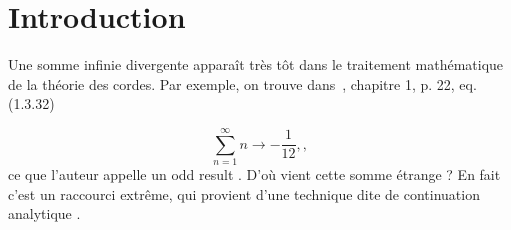 \section{Introduction}

Une somme infinie divergente apparaît très tôt dans le traitement mathématique de la théorie des cordes. Par exemple, on trouve dans~\cite{stringtheory98}, chapitre 1, p. 22, eq. (1.3.32)

\begin{equation}
\sum_{n=1}^{\infty} n \rightarrow -\frac{1}{12},\label{eq.zeta-1},
\end{equation}
ce que l'auteur appelle un \og odd result \fg. D'où vient cette somme étrange ? En fait c'est un raccourci extrême, qui provient d'une technique dite de \og continuation analytique \fg.